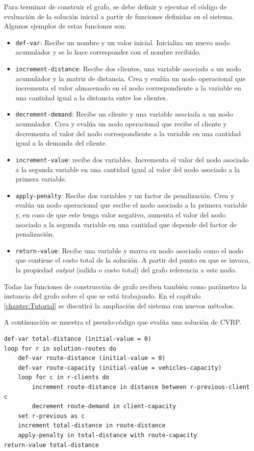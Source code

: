 Para terminar de construir el grafo, se debe definir y ejecutar el código de evaluación de la solución inicial a partir de funciones definidas en el sistema. Algunos ejemplos de estas funciones son:

\begin{itemize}
	\item \texttt{def-var}: Recibe un nombre y un valor inicial. Inicializa un nuevo nodo acumulador y se lo hace corresponder con el nombre recibido.	
	\item \texttt{increment-distance}: Recibe dos clientes, una variable asociada a un nodo acumulador y la matriz de distancia. Crea y evalúa un nodo operacional que incrementa el valor almacenado en el nodo correspondiente a la variable en una cantidad igual a la distancia entre los clientes.
	\item \texttt{decrement-demand}: Recibe un cliente y una variable asociada a un nodo acumulador. Crea y evalúa un nodo operacional que recibe el cliente y decrementa el valor del nodo correspondiente a la variable en una cantidad igual a la demanda del cliente.
	\item \texttt{increment-value}: recibe dos variables. Incrementa el valor del nodo asociado a la segunda variable en una cantidad igual al valor del nodo asociado a la primera variable.
	\item \texttt{apply-penalty}: Recibe dos variables y un factor de penalización. Crea y evalúa un nodo operacional que recibe el nodo asociado a la primera variable y, en caso de que este tenga valor negativo, aumenta el valor del nodo asociado a la segunda variable en una cantidad que depende del factor de penalización.
	\item \texttt{return-value}: Recibe una variable y marca su nodo asociado como el nodo que contiene el costo total de la solución. A partir del punto en que se invoca, la propiedad \textit{output} (salida o costo total) del grafo referencia a este nodo.
\end{itemize}

Todas las funciones de construcción de grafo reciben también como parámetro la instancia del grafo sobre el que se está trabajando. En el capítulo \ref{chapter:Tutorial} se discutirá la ampliación del sistema con nuevos métodos. 

A continuación se muestra el pseudo-código que evalúa una solución de CVRP.

\begin{lstlisting}
def-var total-distance (initial-value = 0)
loop for r in solution-routes do
	def-var route-distance (initial-value = 0)
	def-var route-capacity (initial-value = vehicles-capacity)	
	loop for c in r-clients do
		increment route-distance in distance between r-previous-client c 
		decrement route-demand in client-capacity	
	set r-previous as c
	increment total-distance in route-distance
	apply-penalty in total-distance with route-capacity
return-value total-distance

\end{lstlisting}

